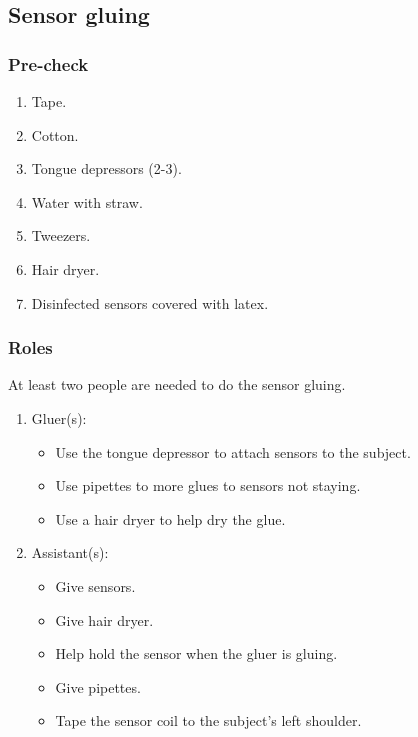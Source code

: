 \documentclass[12pt]{article}
\begin{document}
\subsection{Sensor gluing}
\subsubsection{Pre-check}
    \begin{enumerate}
        \item Tape.
        \item Cotton.
        \item Tongue depressors (2-3).
		\item Water with straw.
		\item Tweezers.
		\item Hair dryer.
		\item Disinfected sensors covered with latex.
    \end{enumerate}
    
    \subsubsection{Roles}
    	At least two people are needed to do the sensor gluing.
    	
    	\bigskip
    	
    	\begin{enumerate}
    	\item Gluer(s):
	        \begin{itemize}
	            \item Use the tongue depressor to attach sensors to the subject.
	            \item Use pipettes to more glues to sensors not staying.
	            \item Use a hair dryer to help dry the glue.
	        \end{itemize}

        \bigskip
        
        \item Assistant(s):
            \begin{itemize}
                \item Give sensors. 
                \item Give hair dryer.
                \item Help hold the sensor when the gluer is gluing. 
                \item Give pipettes.
                \item Tape the sensor coil to the subject's left shoulder.
            \end{itemize}
        \end{enumerate}
\end{document}
